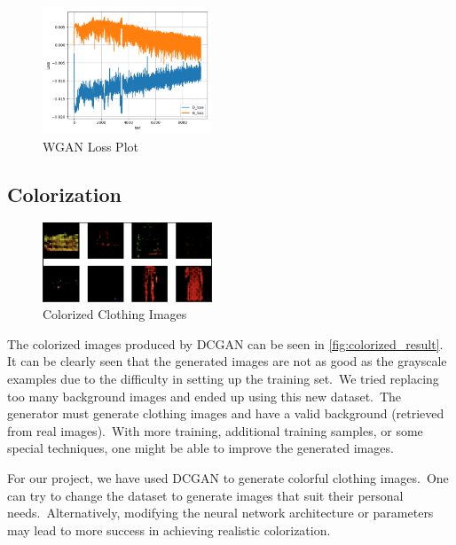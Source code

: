 \documentclass[conference]{IEEEtran}
\begin{document}
    \begin{figure}
        \caption{WGAN Loss Plot}
        \label{fig:loss-plot-wgan}
        \includegraphics[width=0.45\textwidth]{WGAN_loss.png}
        \centering
    \end{figure}

    \subsection{Colorization}\label{subsec:results-colorization}

    \begin{figure}
        \caption{Colorized Clothing Images}
        \label{fig:colorized_result}
        \includegraphics[width=0.45\textwidth]{learned_result.png}
        \centering
    \end{figure}

    The colorized images produced by DCGAN can be seen in \autoref{fig:colorized_result}. It can be clearly seen that the generated images are not as good as the grayscale examples due to the difficulty in setting up the training set.\ We tried replacing too many background images and ended up using this new dataset.\ The generator must generate clothing images and have a valid background (retrieved from real images).\ With more training, additional training samples, or some special techniques, one might be able to improve the generated images.

    For our project, we have used DCGAN to generate colorful clothing images.\ One can try to change the dataset to generate images that suit their personal needs.\ Alternatively, modifying the neural network architecture or parameters may lead to more success in achieving realistic colorization.
\end{document}
